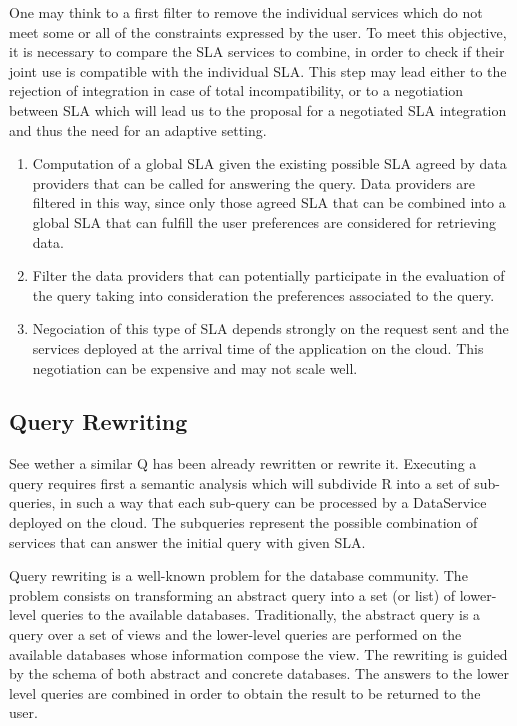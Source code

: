 One may think to a first filter to remove the individual services which do not meet some or all of the constraints expressed by the user. 
To meet this objective, it is necessary to compare the SLA services to combine, in order to check if their joint use is compatible with the individual SLA. This step may lead either to the rejection of integration in case of total incompatibility, or to a negotiation between SLA which will lead us to the proposal for a negotiated SLA integration and thus the need for an adaptive setting.


 \begin{enumerate}
\item Computation of a global SLA given the existing possible SLA agreed by data providers that can be called for answering the query. Data providers are filtered in this way, since only those agreed SLA that can be combined into a global SLA that can fulfill the user preferences are considered for retrieving data.

  
  \item Filter the data providers that can potentially participate in the evaluation of the query taking into consideration the preferences associated to the query.
  
  \item Negociation of this type of SLA depends strongly on the request sent and the services deployed at the arrival time of the application on the cloud. This negotiation can be expensive and may not scale well.
  \end{enumerate}


\subsection{Query Rewriting}
\label{sec:queryRew}
{\color{red}
See wether a similar Q has been already rewritten or rewrite it. Executing a query requires first a semantic analysis which will subdivide R into a set of sub-queries, in such a way that each sub-query can be processed by a DataService deployed on the cloud.   The subqueries represent the possible combination of services that can answer the initial query with given SLA.
}

Query rewriting is a well-known problem for the database community.
The problem consists on transforming an abstract query into a set (or list) of lower-level queries to the available databases.
Traditionally, the abstract query is a query over a set of views and the lower-level queries are performed on the available databases whose information compose the view. 
The rewriting is guided by the schema of both abstract and concrete databases.
The answers to the lower level queries are combined in order to obtain the result to be returned to the user.

